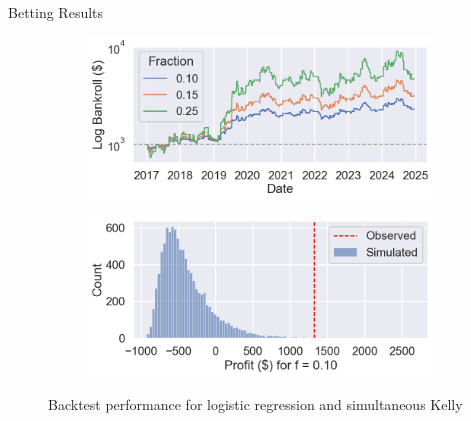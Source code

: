\documentclass[final]{beamer}
\newlength{\colwidth}
\begin{document}
\begin{frame}[t]
\begin{columns}[t]
\begin{column}{\colwidth}
\begin{block}{Betting Results}
    \begin{figure}
        \centering
        \captionsetup{justification=centering}
        \begin{subfigure}{.49\linewidth}
            \centering
            \includegraphics[width=\linewidth]{figures/lr_bankroll.png}
        \end{subfigure}
        \begin{subfigure}{.49\linewidth}
            \centering
            \includegraphics[width=\linewidth]{figures/lr_0.1_null_dist.png}
        \end{subfigure}
        \caption{Backtest performance for logistic regression and simultaneous Kelly}
    \end{figure}
    

\end{block}
\end{column}
\end{columns}
\end{frame}
\end{document}
